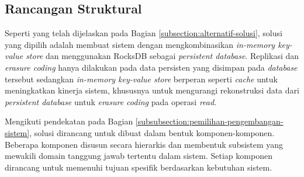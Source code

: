 \subsection{Rancangan Struktural}
\label{subsection:rancangan-struktural}

Seperti yang telah dijelaskan pada Bagian \ref{subsection:alternatif-solusi}, solusi yang dipilih adalah membuat sistem dengan mengkombinasikan \textit{in-memory key-value store} dan menggunakan RocksDB sebagai \textit{persistent database}. Replikasi dan \textit{erasure coding} hanya dilakukan pada data persisten yang disimpan pada \textit{database} tersebut sedangkan \textit{in-memory key-value store} berperan seperti \textit{cache} untuk meningkatkan kinerja sistem, khususnya untuk mengurangi rekonstruksi data dari \textit{persistent database} untuk \textit{erasure coding} pada operasi \textit{read}.

Mengikuti pendekatan pada Bagian \ref{subsubsection:pemilihan-pengembangan-sistem}, solusi dirancang untuk dibuat dalam bentuk komponen-komponen. Beberapa komponen disusun secara hierarkis dan membentuk subsistem yang mewakili domain tanggung jawab tertentu dalam sistem. Setiap komponen dirancang untuk memenuhi tujuan spesifik berdasarkan kebutuhan sistem.


